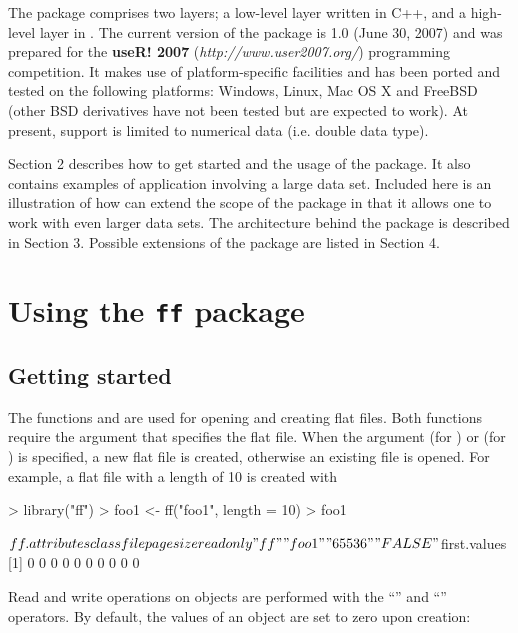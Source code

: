 \documentclass[12pt,a4paper]{article}
\begin{document}
The  package comprises two layers; a low-level layer written in C++, and a high-level layer in \R{}. 
The current version of the package is 1.0 (June 30, 2007) and was prepared for the \textbf{useR! 2007} (\textit{http://www.user2007.org/}) programming competition. 
It makes use of platform-specific facilities and has been ported and tested on the following platforms: Windows, Linux, Mac OS X and FreeBSD (other BSD derivatives have not been tested but are expected to work). 
At present, support is limited to numerical data (i.e. double data type).

Section 2 describes how to get started and the usage of the package. 
It also contains examples of application involving a large data set. 
Included here is an illustration of how  can extend the scope of the package  \citep{biglm} in that it allows one to work with even larger data sets. 
The architecture behind the  package is described in Section 3. 
Possible extensions of the  package are listed in Section 4. 


\section{Using the \texttt{ff} package}

\subsection{Getting started}

The functions  and  are used for opening and creating flat files. 
Both functions require the argument  that specifies the flat file. 
When the argument  (for ) or  (for ) is specified, a new flat file is created, otherwise an existing file is opened.
For example, a flat file with a length of 10 is created with

\begin{Schunk}
\begin{Sinput}
> library("ff")
> foo1 <- ff("foo1", length = 10)
> foo1
\end{Sinput}
\begin{Soutput}
$ff.attributes
   class     file pagesize readonly 
    "ff"   "foo1"  "65536"  "FALSE" 

$first.values
 [1] 0 0 0 0 0 0 0 0 0 0
\end{Soutput}
\end{Schunk}

Read and write operations on  objects are performed with the ``\rc{[\,]}'' and ``\rc{[\,]<-}'' operators. 
By default, the values of an  object are set to zero upon creation:
\end{document}
